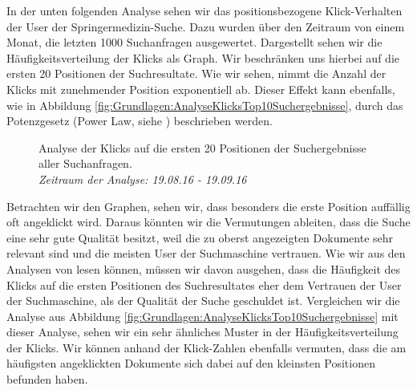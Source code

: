 
In der unten folgenden Analyse sehen wir das positionsbezogene Klick-Verhalten der User der Springermedizin-Suche. Dazu wurden über den Zeitraum von einem Monat, die letzten 1000 Suchanfragen ausgewertet. Dargestellt sehen wir die Häufigkeitsverteilung der Klicks als Graph. Wir beschränken uns hierbei auf die ersten 20 Positionen der Suchresultate. Wie wir sehen, nimmt die Anzahl der Klicks mit zunehmender Position exponentiell ab. Dieser Effekt kann ebenfalls, wie in Abbildung \ref{fig:Grundlagen:AnalyseKlicksTop10Suchergebnisse}, durch das Potenzgesetz (Power Law, siehe \cite{PowerLaw}) beschrieben werden. 

\begin{figure}[H]
\centering 
 
\topRanks
  

\caption[Analyse der Klicks auf die ersten 20 Positionen der Suchergebnisse aller Suchanfragen. \textit{Zeitraum der Analyse: 19.08.16 - 19.09.16}]{Analyse der Klicks auf die ersten 20 Positionen der Suchergebnisse aller Suchanfragen. \\ \textit{Zeitraum der Analyse: 19.08.16 - 19.09.16}}
\label{fig:Grundlage:AnalyseKlicksPositionen}
\vspace{-2.5em}
\end{figure}

Betrachten wir den Graphen, sehen wir, dass besonders die erste Position auffällig oft angeklickt wird. Daraus könnten wir die Vermutungen ableiten, dass die Suche eine sehr gute Qualität besitzt, weil die zu oberst angezeigten Dokumente sehr relevant sind und die meisten User der Suchmaschine vertrauen. Wie wir aus den Analysen von \cite{Joachims} lesen können, müssen wir davon ausgehen, dass die Häufigkeit des Klicks auf die ersten Positionen des Suchresultates eher dem Vertrauen der User der Suchmaschine, als der Qualität der Suche geschuldet ist. Vergleichen wir die Analyse aus Abbildung \ref{fig:Grundlagen:AnalyseKlicksTop10Suchergebnisse} mit dieser Analyse, sehen wir ein sehr ähnliches Muster in der Häufigkeitsverteilung der Klicks. Wir können anhand der Klick-Zahlen ebenfalls vermuten, dass die am häufigsten angeklickten Dokumente sich dabei auf den kleinsten Positionen befunden haben.